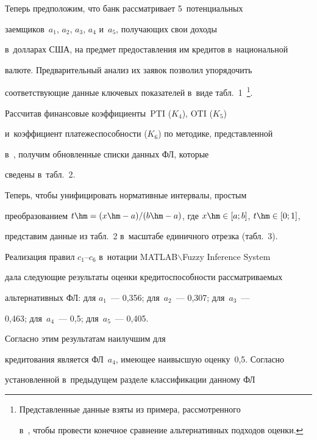   

  Теперь предположим, что банк рассматривает 5~потенциальных 

заемщиков~$a_1$, $a_2$, $a_3$, $a_4$ и~$a_5$, получающих свои доходы 

в~долларах США, на предмет предоставления им кредитов в~национальной 

валюте. Предварительный анализ их заявок позволил упорядочить 

соответствующие данные ключевых показателей в~виде табл.~1~\cite{4-rz}\footnote{Представленные данные взяты из примера, рассмотренного 

в~\cite{4-rz}, чтобы провести конечное сравнение альтернативных подходов оценки.}. 

  

  





  Рассчитав финансовые коэффициенты~PTI ($K_4$), OTI ($K_5$) 

и~коэффициент платежеспособности ($K_6$) по методике, представленной  

в~\cite{4-rz, 5-rz, 6-rz}, получим обновленные списки данных ФЛ, которые 

сведены в~табл.~2. 

  



  Теперь, чтобы унифицировать нормативные интервалы, простым 

преобразованием $t\hm=(x\hm- a)/(b\hm-a)$, где $x\hm\in [a; b]$, $t\hm\in [0; 1]$, 

представим данные из табл.~2 в~масштабе единичного отрезка (табл.~3). 



 



  

  Реализация правил $c_1$--$c_6$ в~нотации MATLAB$\backslash$Fuzzy Inference System 

дала следующие результаты оценки кредитоспособности рассматриваемых 

альтернативных ФЛ: для $a_1$~--- 0,356; для~$a_2$~--- 0,307; для~$a_3$~--- 

0,463; для~$a_4$~--- 0,5; для~$a_5$~--- 0,405. 

Согласно этим результатам наилучшим для 

кредитования является ФЛ~$a_4$, имеющее наивысшую оценку~0,5. Согласно 

установленной в~предыдущем разделе классификации данному ФЛ 

